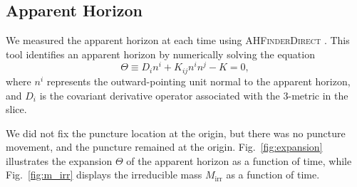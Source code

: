 \documentclass[%
 reprint,
 amsmath,amssymb,
 aps,
 prd,
]{revtex4-2}
\begin{document}
%
%
%
%

\subsection{Apparent Horizon}

We measured the apparent horizon at each time using \textsc{AHFinderDirect} \cite{Thornburg:1995cp, Thornburg:2003sf}. This tool identifies an apparent horizon by numerically solving the equation
\begin{equation}
	\Theta \equiv D_i n^i + K_{ij} n^i n^j - K = 0,
\end{equation}
where $n^i$ represents the outward-pointing unit normal to the apparent horizon, and $D_i$ is the covariant derivative operator associated with the 3-metric in the slice.

We did not fix the puncture location at the origin, but there was no puncture movement, and the puncture remained at the origin. Fig.~\ref{fig:expansion} illustrates the expansion $\Theta$ of the apparent horizon as a function of time, while Fig.~\ref{fig:m_irr} displays the irreducible mass $M_\mathrm{irr}$ as a function of time.
\end{document}
